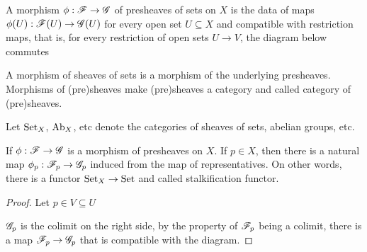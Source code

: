 \begin{definition}
	A morphism $\phi: \mathscr{F} \to \mathscr{G}$ of presheaves of sets on $X$ is the data of maps $\phi(U): \mathscr{F}(U) \to \mathscr{G}(U)$ for every open set $U \subseteq X$ and compatible with restriction maps, that is, for every restriction of open sets $U \to V$, the diagram below commutes
	\begin{center}
	\end{center}
	
	A morphism of sheaves of sets is a morphism of the underlying presheaves. Morphisms of (pre)sheaves make (pre)sheaves a category and called category of (pre)sheaves.
	
	Let $\operatorname{Set}_X$, $\operatorname{Ab}_X$, etc denote the categories of sheaves of sets, abelian groups, etc.
\end{definition}

\begin{proposition}
	If $\phi: \mathscr{F} \to \mathscr{G}$ is a morphism of presheaves on $X$. If $p \in X$, then there is a natural map $\phi_p: \mathscr{F}_p \to \mathscr{G}_p$ induced from the map of representatives. On other words, there is a functor $\operatorname{Set}_X \to \operatorname{Set}$ and called stalkification functor.
\end{proposition}

\begin{proof}
	Let $p \in V \subseteq U$
	\begin{center}
	\end{center}
	
	$\mathscr{G}_p$ is the colimit on the right side, by the property of $\mathscr{F}_p$ being a colimit, there is a map $\mathscr{F}_p \to \mathscr{G}_p$ that is compatible with the diagram.
	
	
\end{proof}

